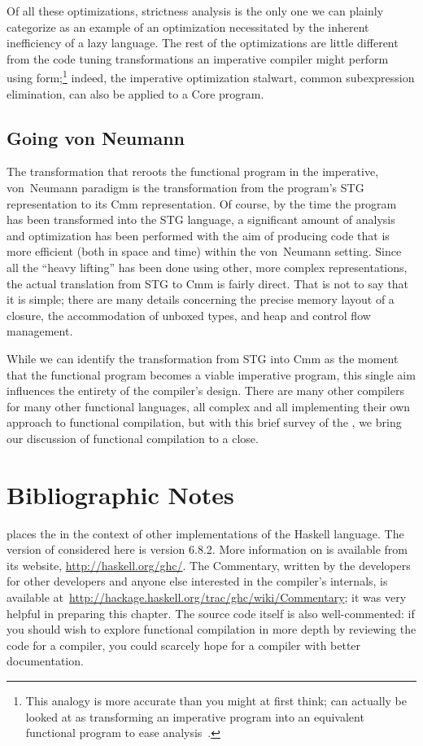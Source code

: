 Of all these optimizations, strictness analysis is the only one we can plainly categorize as an example of an optimization necessitated by the inherent inefficiency of a lazy language. The rest of the optimizations are little different from the code tuning transformations an imperative compiler might perform using \SSA[long] form;\footnote{This analogy is more accurate than you might at first think; \SSA can actually be looked at as transforming an imperative program into an equivalent functional program to ease analysis~\citep{Appel:SSA-is-functional:1998}.} indeed, the imperative optimization stalwart, common subexpression elimination, can also be applied to a Core program.

\subsection{Going von Neumann}
The transformation that reroots the functional program in the imperative, von~Neumann paradigm is the transformation from the program's STG representation to its Cmm representation. Of course, by the time the program has been transformed into the STG language, a significant amount of analysis and optimization has been performed with the aim of producing code that is more efficient (both in space and time) within the von~Neumann setting. Since all the ``heavy lifting'' has been done using other, more complex representations, the actual translation from STG to Cmm is fairly direct. That is not to say that it is simple; there are many details concerning the precise memory layout of a closure, the accommodation of unboxed types, and heap and control flow management.

While we can identify the transformation from STG into Cmm as the moment that the functional program becomes a viable imperative program, this single aim influences the entirety of the compiler's design. There are many other compilers for many other functional languages, all complex and all implementing their own approach to functional compilation, but with this brief survey of the \GHC[long], we bring our discussion of functional compilation to a close.

\section{Bibliographic Notes}
 places the \GHC[long] in the context of other implementations of the Haskell language. The version of \GHC considered here is version 6.8.2. More information on \GHC{} is available from its website, \url{http://haskell.org/ghc/}. The \GHC Commentary, written by the developers for other developers and anyone else interested in the compiler's internals, is available at~\url{http://hackage.haskell.org/trac/ghc/wiki/Commentary}; it was very helpful in preparing this chapter. The source code itself is also well-commented: if you should wish to explore functional compilation in more depth by reviewing the code for a compiler, you could scarcely hope for a compiler with better documentation.

